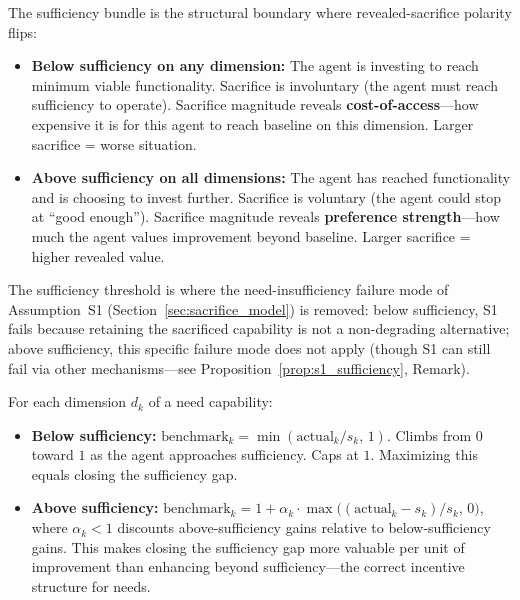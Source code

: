 \begin{definition}
\label{def:polarity_boundary}
The sufficiency bundle is the structural boundary where
revealed-sacrifice polarity flips:
\begin{itemize}
\item \textbf{Below sufficiency on any dimension:} The agent is
  investing to reach minimum viable functionality.  Sacrifice is
  involuntary (the agent must reach sufficiency to operate).
  Sacrifice magnitude reveals \textbf{cost-of-access}---how
  expensive it is for this agent to reach baseline on this
  dimension.  Larger sacrifice = worse situation.
\item \textbf{Above sufficiency on all dimensions:} The agent has
  reached functionality and is choosing to invest further.
  Sacrifice is voluntary (the agent could stop at ``good
  enough'').  Sacrifice magnitude reveals \textbf{preference
  strength}---how much the agent values improvement beyond
  baseline.  Larger sacrifice = higher revealed value.
\end{itemize}
The sufficiency threshold is where the need-insufficiency failure
mode of Assumption~S1 (Section~\ref{sec:sacrifice_model}) is
removed: below sufficiency, S1 fails because retaining the
sacrificed capability is not a non-degrading alternative; above
sufficiency, this specific failure mode does not apply (though S1
can still fail via other mechanisms---see
Proposition~\ref{prop:s1_sufficiency}, Remark).
\end{definition}

\begin{definition}
\label{def:polarity_benchmark}
For each dimension $d_k$ of a need capability:
\begin{itemize}
\item \textbf{Below sufficiency:}
  $\mathrm{benchmark}_k = \min(\mathrm{actual}_k / s_k,\, 1)$.
  Climbs from $0$ toward $1$ as the agent approaches sufficiency.
  Caps at $1$.  Maximizing this equals closing the sufficiency
  gap.
\item \textbf{Above sufficiency:}
  $\mathrm{benchmark}_k = 1 + \alpha_k \cdot
  \max\!\bigl((\mathrm{actual}_k - s_k)/s_k,\, 0\bigr)$,
  where $\alpha_k < 1$ discounts above-sufficiency gains relative
  to below-sufficiency gains.  This makes closing the sufficiency
  gap more valuable per unit of improvement than enhancing beyond
  sufficiency---the correct incentive structure for needs.
\end{itemize}
\end{definition}

